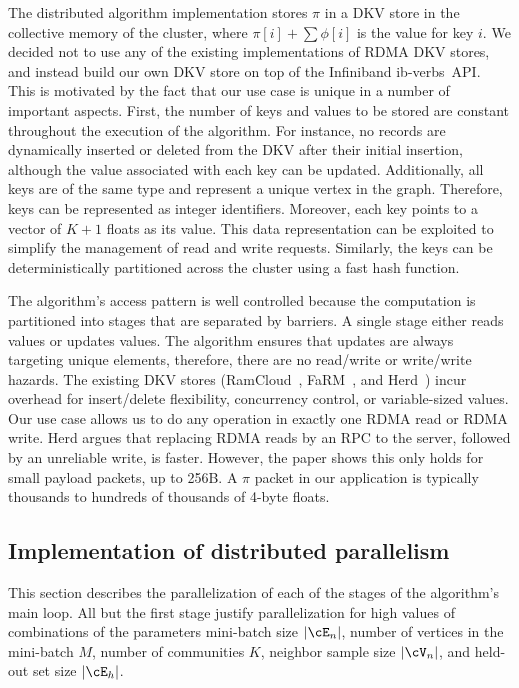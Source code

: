 The distributed algorithm implementation stores $\pi$ in a DKV store in the
collective memory of the
cluster, where $\pi[i]+\sum\phi[i]$ is the value for key $i$.
%
We decided not
to use any of the existing implementations of RDMA DKV stores, and instead
build our own DKV store on top of the Infiniband ib-verbs~API.
%
This is motivated by the fact that our use case is unique in a number
of important aspects. First, the number of keys and values to be stored are
constant throughout the execution of the algorithm. For instance, no records
are dynamically inserted or deleted from the DKV after their initial insertion,
although the value associated with each key can be updated. Additionally, all
keys are of the same type and represent a unique vertex in the graph.
Therefore, keys can be represented as integer identifiers. Moreover, each key
points to a vector of $K+1$ floats as its value.
%
This data representation can be exploited to simplify the management of
read and write requests. Similarly, the keys can be deterministically
partitioned across the cluster using a fast hash function.

The algorithm's access pattern is well controlled because the
computation is partitioned into stages that are separated by barriers. A
single stage either reads values or updates values. The algorithm ensures that updates
are always targeting unique elements,
therefore, there are no read/write or write/write hazards. The existing DKV
stores (RamCloud~\cite{Ousterhout:2015:RSS:2818727.2806887}, FaRM~\cite{179767},
and Herd~\cite{Kalia:2014:URE:2740070.2626299}) incur
overhead for insert/delete flexibility, concurrency control, or variable-sized
values. Our use case allows us to do any operation in exactly one RDMA read
or RDMA write.
%
Herd argues that replacing RDMA reads by
an RPC to the server, followed by an unreliable write, is faster.
%
However,
the paper shows this only holds for small payload packets, up to 256B. A $\pi$
packet in our application is typically thousands to hundreds of thousands
of 4-byte floats.


\subsection{Implementation of distributed parallelism}

This section describes the parallelization of each of the stages of the
algorithm's main loop. All but the first stage justify parallelization for
high values of combinations of the parameters mini-batch size $|\Minibatch|$,
number of vertices in the mini-batch $M$,
number of communities $K$, neighbor sample size $|\Neighbors|$, and held-out set
size $|\cE_h|$.

